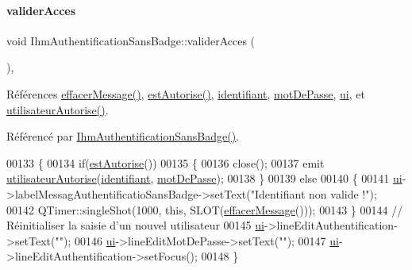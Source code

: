 \paragraph{\texorpdfstring{valider\+Acces}{validerAcces}}
{\footnotesize\ttfamily void Ihm\+Authentification\+Sans\+Badge\+::valider\+Acces (\begin{DoxyParamCaption}{ }\end{DoxyParamCaption})\hspace{0.3cm}{\ttfamily [private]}, {\ttfamily [slot]}}



Références \hyperlink{class_ihm_authentification_sans_badge_a6dfdc8197ea602634455e80b35af7c87}{effacer\+Message()}, \hyperlink{class_ihm_authentification_sans_badge_a17b178accdfe141a7e27fa1888bebcbc}{est\+Autorise()}, \hyperlink{class_ihm_authentification_sans_badge_aff90fe3fcf957daa57ca0318a4b1a2d0}{identifiant}, \hyperlink{class_ihm_authentification_sans_badge_a3a5c5887be56c7f1b5dcd1bf824d09c4}{mot\+De\+Passe}, \hyperlink{class_ihm_authentification_sans_badge_a95e8a9d049b6e5f262b45e3362d2bbee}{ui}, et \hyperlink{class_ihm_authentification_sans_badge_a610528b307f2a3f3253aed3b5f628837}{utilisateur\+Autorise()}.



Référencé par \hyperlink{class_ihm_authentification_sans_badge_aace6d9eebcab9fee429fe9dbb6840f15}{Ihm\+Authentification\+Sans\+Badge()}.


\begin{DoxyCode}
00133 \{
00134     \textcolor{keywordflow}{if}(\hyperlink{class_ihm_authentification_sans_badge_a17b178accdfe141a7e27fa1888bebcbc}{estAutorise}())
00135     \{
00136         close();
00137         emit \hyperlink{class_ihm_authentification_sans_badge_a610528b307f2a3f3253aed3b5f628837}{utilisateurAutorise}(\hyperlink{class_ihm_authentification_sans_badge_aff90fe3fcf957daa57ca0318a4b1a2d0}{identifiant}, 
      \hyperlink{class_ihm_authentification_sans_badge_a3a5c5887be56c7f1b5dcd1bf824d09c4}{motDePasse});
00138     \}
00139     \textcolor{keywordflow}{else}
00140     \{
00141         \hyperlink{class_ihm_authentification_sans_badge_a95e8a9d049b6e5f262b45e3362d2bbee}{ui}->labelMessagAuthentificatioSansBadge->setText(\textcolor{stringliteral}{"Identifiant non valide !"});
00142         QTimer::singleShot(1000, \textcolor{keyword}{this}, SLOT(\hyperlink{class_ihm_authentification_sans_badge_a6dfdc8197ea602634455e80b35af7c87}{effacerMessage}()));
00143     \}
00144     \textcolor{comment}{// Réinitialiser la saisie d'un nouvel utilisateur}
00145     \hyperlink{class_ihm_authentification_sans_badge_a95e8a9d049b6e5f262b45e3362d2bbee}{ui}->lineEditAuthentification->setText(\textcolor{stringliteral}{""});
00146     \hyperlink{class_ihm_authentification_sans_badge_a95e8a9d049b6e5f262b45e3362d2bbee}{ui}->lineEditMotDePasse->setText(\textcolor{stringliteral}{""});
00147     \hyperlink{class_ihm_authentification_sans_badge_a95e8a9d049b6e5f262b45e3362d2bbee}{ui}->lineEditAuthentification->setFocus();
00148 \}
\end{DoxyCode}


